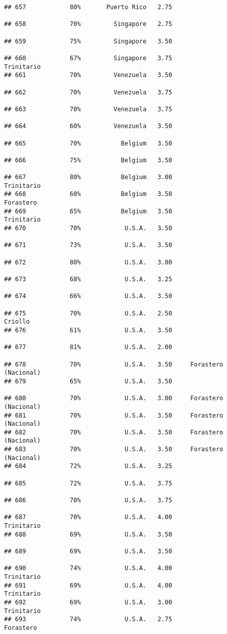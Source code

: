 \documentclass[
]{article}
\begin{document}
\begin{verbatim}
## 657            80%       Puerto Rico   2.75                         
## 658            70%         Singapore   2.75                         
## 659            75%         Singapore   3.50                         
## 660            67%         Singapore   3.75               Trinitario
## 661            70%         Venezuela   3.50                         
## 662            70%         Venezuela   3.75                         
## 663            70%         Venezuela   3.75                         
## 664            60%         Venezuela   3.50                         
## 665            70%           Belgium   3.50                         
## 666            75%           Belgium   3.50                         
## 667            80%           Belgium   3.00               Trinitario
## 668            60%           Belgium   3.50                Forastero
## 669            65%           Belgium   3.50               Trinitario
## 670            70%            U.S.A.   3.50                         
## 671            73%            U.S.A.   3.50                         
## 672            80%            U.S.A.   3.00                         
## 673            68%            U.S.A.   3.25                         
## 674            66%            U.S.A.   3.50                         
## 675            70%            U.S.A.   2.50                  Criollo
## 676            61%            U.S.A.   3.50                         
## 677            81%            U.S.A.   2.00                         
## 678            70%            U.S.A.   3.50     Forastero (Nacional)
## 679            65%            U.S.A.   3.50                         
## 680            70%            U.S.A.   3.00     Forastero (Nacional)
## 681            70%            U.S.A.   3.50     Forastero (Nacional)
## 682            70%            U.S.A.   3.50     Forastero (Nacional)
## 683            70%            U.S.A.   3.50     Forastero (Nacional)
## 684            72%            U.S.A.   3.25                         
## 685            72%            U.S.A.   3.75                         
## 686            70%            U.S.A.   3.75                         
## 687            70%            U.S.A.   4.00               Trinitario
## 688            69%            U.S.A.   3.50                         
## 689            69%            U.S.A.   3.50                         
## 690            74%            U.S.A.   4.00               Trinitario
## 691            69%            U.S.A.   4.00               Trinitario
## 692            69%            U.S.A.   3.00               Trinitario
## 693            74%            U.S.A.   2.75                Forastero

\end{verbatim}
\end{document}
